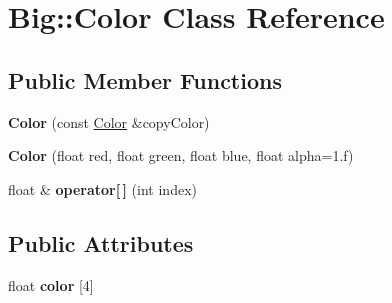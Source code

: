 \hypertarget{class_big_1_1_color}{}\section{Big\+:\+:Color Class Reference}
\label{class_big_1_1_color}
\subsection*{Public Member Functions}
\begin{DoxyCompactItemize}
\item 
\mbox{\label{class_big_1_1_color_adcaec101e8dd95fbcc4622b662e74404}} 
{\bfseries Color} (const \mbox{\hyperlink{class_big_1_1_color}{Color}} \&copy\+Color)
\item 
\mbox{\label{class_big_1_1_color_a8d768ff3f237ddb4434baf7c6d17550a}} 
{\bfseries Color} (float red, float green, float blue, float alpha=1.f)
\item 
\mbox{\label{class_big_1_1_color_ad7313105f14bb2cdb8eb87a68de94270}} 
float \& {\bfseries operator\mbox{[}$\,$\mbox{]}} (int index)
\end{DoxyCompactItemize}
\subsection*{Public Attributes}
\begin{DoxyCompactItemize}
\item 
\mbox{\label{class_big_1_1_color_a4348f7575dc0a9126e044281967c5c13}} 
float {\bfseries color} \mbox{[}4\mbox{]}
\end{DoxyCompactItemize}
